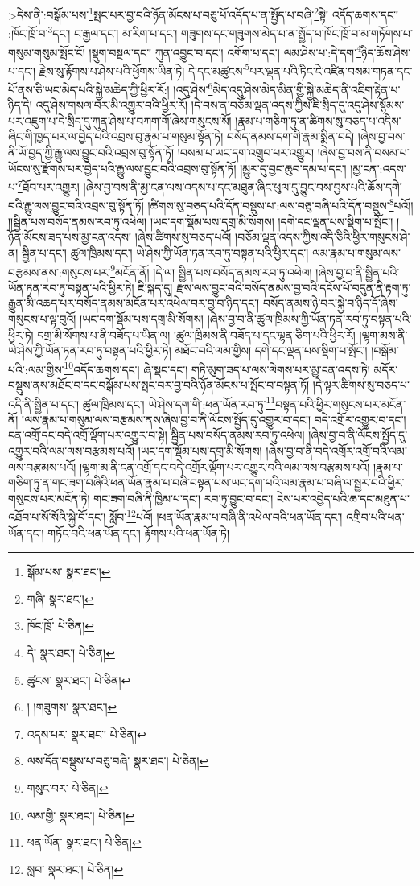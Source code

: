  >དེས་ནི་:བསྒོམ་པས་\footnote{སྒོམ་པས་  སྣར་ཐང་། }སྤང་པར་བྱ་བའི་ཉོན་མོངས་པ་བཅུ་པོ་འདོད་པ་ན་སྤྱོད་པ་བཞི་\footnote{གཞི་  སྣར་ཐང་། }སྟེ། འདོད་ཆགས་དང་། :ཁོང་ཁྲོ་བ་\footnote{ཁོང་ཁྲོ་  པེ་ཅིན། }དང་། ང་རྒྱལ་དང་། མ་རིག་པ་དང་། གཟུགས་དང་གཟུགས་མེད་པ་ན་སྤྱོད་པ་ཁོང་ཁྲོ་བ་མ་གཏོགས་པ་གསུམ་གསུམ་སྤོང་ངོ། །སྡུག་བསྔལ་དང་། ཀུན་འབྱུང་བ་དང་། འགོག་པ་དང་། ལམ་ཤེས་པ་:དེ་དག་\footnote{དེ་  སྣར་ཐང་།  པེ་ཅིན། }ཉིད་ཆོས་ཤེས་པ་དང་། རྗེས་སུ་རྟོགས་པ་ཤེས་པའི་ཕྱོགས་ཡིན་ཏེ། དེ་དང་མཚུངས་\footnote{ཚུངས་  སྣར་ཐང་།  པེ་ཅིན། }པར་ལྡན་པའི་ཏིང་ངེ་འཛིན་བསམ་གཏན་དང་པོ་ནས་ཅི་ཡང་མེད་པའི་སྐྱེ་མཆེད་ཀྱི་ཕྱིར་རོ:། །འདུ་ཤེས་\footnote{། །གཟུགས་  སྣར་ཐང་། }མེད་འདུ་ཤེས་མེད་མིན་གྱི་སྐྱེ་མཆེད་ནི་འཇིག་རྟེན་པ་ཉིད་དེ། འདུ་ཤེས་གསལ་བར་མི་འགྱུར་བའི་ཕྱིར་རོ། །དེ་བས་ན་བཅོམ་ལྡན་འདས་ཀྱིས་ཇི་སྲིད་དུ་འདུ་ཤེས་སྙོམས་པར་འཇུག་པ་དེ་སྲིད་དུ་ཀུན་ཤེས་པ་བཀག་གོ་ཞེས་གསུངས་སོ། །རྣམ་པ་གཅིག་ཏུ་ན་ཚིགས་སུ་བཅད་པ་འདིས་ཞིང་གི་ཁྱད་པར་ལ་བྱེད་པའི་འབྲས་བུ་རྣམ་པ་གསུམ་སྟོན་ཏེ། བསོད་ནམས་དག་གི་རྣམ་སྨིན་བདེ། །ཞེས་བྱ་བས་ནི་ཡོ་བྱད་ཀྱི་རྒྱུ་ལས་བྱུང་བའི་འབྲས་བུ་སྟོན་ཏོ། །བསམ་པ་ཡང་དག་འགྲུབ་པར་འགྱུར། །ཞེས་བྱ་བས་ནི་བསམ་པ་ཡོངས་སུ་རྫོགས་པར་བྱེད་པའི་རྒྱུ་ལས་བྱུང་བའི་འབྲས་བུ་སྟོན་ཏོ། །མྱུར་དུ་བྱང་ཆུབ་དམ་པ་དང་། །མྱ་ངན་:འདས་པ་\footnote{འདས་པར་  སྣར་ཐང་།  པེ་ཅིན། }ཐོབ་པར་འགྱུར། །ཞེས་བྱ་བས་ནི་མྱ་ངན་ལས་འདས་པ་དང་མཐུན་ཞིང་ཕུལ་དུ་བྱུང་བས་བྱས་པའི་ཆོས་དགེ་བའི་རྒྱུ་ལས་བྱུང་བའི་འབྲས་བུ་སྟོན་ཏོ། །ཚིགས་སུ་བཅད་པའི་དོན་བསྡུས་པ་:ལས་བཅུ་བཞི་པའི་དོན་བསྡུས་\footnote{ལས་དོན་བསྡུས་པ་བཅུ་བཞི་  སྣར་ཐང་།  པེ་ཅིན། }པའོ།། །།སྦྱིན་པས་བསོད་ནམས་རབ་ཏུ་འཕེལ། །ཡང་དག་སྡོམ་པས་དགྲ་མི་སོགས། །དགེ་དང་ལྡན་པས་སྡིག་པ་སྤོང་། །ཉོན་མོངས་ཟད་པས་མྱ་ངན་འདས། །ཞེས་ཚིགས་སུ་བཅད་པའོ། །བཅོམ་ལྡན་འདས་ཀྱིས་འདི་ཅིའི་ཕྱིར་གསུངས་ཤེ་ན། སྦྱིན་པ་དང་། ཚུལ་ཁྲིམས་དང་། ཡེ་ཤེས་ཀྱི་ཡོན་ཏན་རབ་ཏུ་བསྟན་པའི་ཕྱིར་དང་། ལམ་རྣམ་པ་གསུམ་ལས་བརྩམས་ནས་:གསུངས་པར་\footnote{གསུང་བར་  པེ་ཅིན། }མངོན་ནོ། །དེ་ལ། སྦྱིན་པས་བསོད་ནམས་རབ་ཏུ་འཕེལ། །ཞེས་བྱ་བ་ནི་སྦྱིན་པའི་ཡོན་ཏན་རབ་ཏུ་བསྟན་པའི་ཕྱིར་ཏེ། ཇི་སྐད་དུ། རྫས་ལས་བྱུང་བའི་བསོད་ནམས་བྱ་བའི་དངོས་པོ་བདུན་ནི་རྟག་ཏུ་རྒྱུན་མི་འཆད་པར་བསོད་ནམས་མངོན་པར་འཕེལ་བར་བྱ་བ་ཉིད་དང་། བསོད་ནམས་ཉེ་བར་སྐྱེ་བ་ཉིད་དོ་ཞེས་གསུངས་པ་ལྟ་བུའོ། །ཡང་དག་སྡོམ་པས་དགྲ་མི་སོགས། །ཞེས་བྱ་བ་ནི་ཚུལ་ཁྲིམས་ཀྱི་ཡོན་ཏན་རབ་ཏུ་བསྟན་པའི་ཕྱིར་ཏེ། དགྲ་མི་སོགས་པ་ནི་བཟོད་པ་ཡིན་ལ། །ཚུལ་ཁྲིམས་ནི་བཟོད་པ་དང་ལྷན་ཅིག་པའི་ཕྱིར་རོ། །ལྷག་མས་ནི་ཡེ་ཤེས་ཀྱི་ཡོན་ཏན་རབ་ཏུ་བསྟན་པའི་ཕྱིར་ཏེ། མཐོང་བའི་ལམ་གྱིས། དགེ་དང་ལྡན་པས་སྡིག་པ་སྤོང་། །བསྒོམ་པའི་:ལམ་གྱིས་\footnote{ལམ་གྱི་  སྣར་ཐང་།  པེ་ཅིན། }འདོད་ཆགས་དང་། ཞེ་སྡང་དང་། གཏི་མུག་ཟད་པ་ལས་ལེགས་པར་མྱ་ངན་འདས་ཏེ། མདོར་བསྡུས་ནས་མཐོང་བ་དང་བསྒོམ་པས་སྤང་བར་བྱ་བའི་ཉོན་མོངས་པ་སྤོང་བ་བསྟན་ཏོ། །དེ་ལྟར་ཚིགས་སུ་བཅད་པ་འདི་ནི་སྦྱིན་པ་དང་། ཚུལ་ཁྲིམས་དང་། ཡེ་ཤེས་དག་གི་:ཕན་ཡོན་རབ་ཏུ་\footnote{ཕན་ཡོན་  སྣར་ཐང་།  པེ་ཅིན། }བསྟན་པའི་ཕྱིར་གསུངས་པར་མངོན་ནོ། །ལས་རྣམ་པ་གསུམ་ལས་བརྩམས་ནས་ཞེས་བྱ་བ་ནི་ལོངས་སྤྱོད་དུ་འགྱུར་བ་དང་། བདེ་འགྲོར་འགྱུར་བ་དང་། ངན་འགྲོ་དང་བདེ་འགྲོ་ལྡོག་པར་འགྱུར་བ་སྟེ། སྦྱིན་པས་བསོད་ནམས་རབ་ཏུ་འཕེལ། །ཞེས་བྱ་བ་ནི་ལོངས་སྤྱོད་དུ་འགྱུར་བའི་ལམ་ལས་བརྩམས་པའོ། །ཡང་དག་སྡོམ་པས་དགྲ་མི་སོགས། །ཞེས་བྱ་བ་ནི་བདེ་འགྲོར་འགྲོ་བའི་ལམ་ལས་བརྩམས་པའོ། །ལྷག་མ་ནི་ངན་འགྲོ་དང་བདེ་འགྲོར་ལྡོག་པར་འགྱུར་བའི་ལམ་ལས་བརྩམས་པའོ། །རྣམ་པ་གཅིག་ཏུ་ན་གང་ཟག་བཞིའི་ཕན་ཡོན་རྣམ་པ་བཞི་བསྟན་པས་ཡང་དག་པའི་ལམ་རྣམ་པ་བཞི་ལ་སྦྱར་བའི་ཕྱིར་གསུངས་པར་མངོན་ཏེ། གང་ཟག་བཞི་ནི་ཁྱིམ་པ་དང་། རབ་ཏུ་བྱུང་བ་དང་། ངེས་པར་འབྱེད་པའི་ཆ་དང་མཐུན་པ་འཐོབ་པ་སོ་སོའི་སྐྱེ་བོ་དང་། སློབ་\footnote{སླབ་  སྣར་ཐང་།  པེ་ཅིན། }པའོ། །ཕན་ཡོན་རྣམ་པ་བཞི་ནི་འཕེལ་བའི་ཕན་ཡོན་དང་། འགྲིབ་པའི་ཕན་ཡོན་དང་། གཏོང་བའི་ཕན་ཡོན་དང་། རྟོགས་པའི་ཕན་ཡོན་ཏེ། 